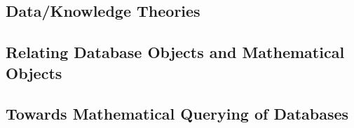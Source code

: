 \documentclass{../../Proposal/LaTeX-proposal/deliverablereport}
\begin{document}
  \subsection{Data/Knowledge Theories}\label{sec:data:def}
   
  \subsection{Relating Database Objects and Mathematical Objects}\label{sec:data:impl}
   
  \subsection{Towards Mathematical Querying of Databases}\label{sec:querying}
   




\newpage\printbibliography

\begin{appendix}

\end{appendix}
\end{document}
